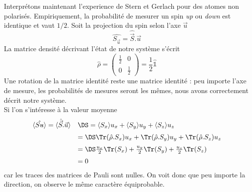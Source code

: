 Interprétons maintenant l'experience de Stern et Gerlach pour des atomes non polarisés. Empiriquement, la 
probabilité de mesurer un spin \textit{up} ou \textit{down} est identique et vaut $1/2$. Soit la projection 
du spin selon l'axe $\vec{u}$
\begin{equation}
\hat{S_{\vec{u}}} = \hat{\vec{S}}.\vec{u}
\end{equation}
La matrice densité décrivant l'état de notre système s'écrit
\begin{equation}
\hat{\rho} = \left(\begin{array}{cc}
\frac{1}{2}&0\\
0&\frac{1}{2}
\end{array}\right) = \frac{1}{2}\hat{\mathbb{1}}
\end{equation}
Une rotation de la matrice identité reste une matrice identité : peu importe l'axe de mesure, les probabilités de 
mesures seront les mêmes, nous avons correctement décrit notre système. \\

Si l'on s'intéresse à la valeur moyenne 
\begin{equation}
\begin{array}{ll}
\langle \hat{S_{\vec{u}}}\rangle =\langle \hat{\vec{S}}.\vec{u}\rangle &\DS= \langle S_x\rangle u_x+
\langle S_y\rangle u_y+\langle S_z\rangle u_z\vspace{2mm}\\
&=\DS \Tr(\hat{\rho}.S_x)u_x+\Tr(\hat{\rho}.S_y)u_y+\Tr(\hat{\rho}.S_z)u_z\vspace{2mm} \\
&=\DS \frac{u_x}{2}\Tr(S_x)+\frac{u_y}{2}\Tr(S_y)+\frac{u_z}{2}\Tr(S_z)\vspace{2mm}\\
&=0
\end{array}
\end{equation}
car les traces des matrices de Pauli sont nulles. On voit donc que peu importe la direction, on observe le même
caractère équiprobable. \\

